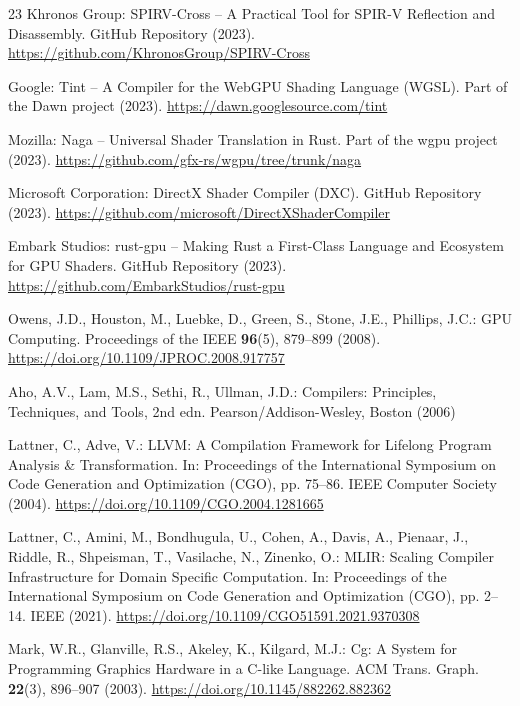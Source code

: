 \documentclass{svproc}
\begin{document}
\begin{thebibliography}{23}
Khronos Group: SPIRV-Cross -- A Practical Tool for SPIR-V Reflection and Disassembly.
GitHub Repository (2023).
\url{https://github.com/KhronosGroup/SPIRV-Cross}

Google: Tint -- A Compiler for the WebGPU Shading Language (WGSL).
Part of the Dawn project (2023).
\url{https://dawn.googlesource.com/tint}

Mozilla: Naga -- Universal Shader Translation in Rust.
Part of the wgpu project (2023).
\url{https://github.com/gfx-rs/wgpu/tree/trunk/naga}

Microsoft Corporation: DirectX Shader Compiler (DXC).
GitHub Repository (2023).
\url{https://github.com/microsoft/DirectXShaderCompiler}

Embark Studios: rust-gpu -- Making Rust a First-Class Language and Ecosystem for GPU Shaders.
GitHub Repository (2023).
\url{https://github.com/EmbarkStudios/rust-gpu}

Owens, J.D., Houston, M., Luebke, D., Green, S., Stone, J.E., Phillips, J.C.: GPU Computing.
Proceedings of the IEEE \textbf{96}(5), 879--899 (2008).
\url{https://doi.org/10.1109/JPROC.2008.917757}

Aho, A.V., Lam, M.S., Sethi, R., Ullman, J.D.: Compilers: Principles, Techniques, and Tools, 2nd edn.
Pearson/Addison-Wesley, Boston (2006)

Lattner, C., Adve, V.: LLVM: A Compilation Framework for Lifelong Program Analysis \& Transformation.
In: Proceedings of the International Symposium on Code Generation and Optimization (CGO), pp. 75--86.
IEEE Computer Society (2004).
\url{https://doi.org/10.1109/CGO.2004.1281665}

Lattner, C., Amini, M., Bondhugula, U., Cohen, A., Davis, A., Pienaar, J., Riddle, R., Shpeisman, T., Vasilache, N., Zinenko, O.: MLIR: Scaling Compiler Infrastructure for Domain Specific Computation.
In: Proceedings of the International Symposium on Code Generation and Optimization (CGO), pp. 2--14.
IEEE (2021).
\url{https://doi.org/10.1109/CGO51591.2021.9370308}

Mark, W.R., Glanville, R.S., Akeley, K., Kilgard, M.J.: Cg: A System for Programming Graphics Hardware in a C-like Language.
ACM Trans. Graph. \textbf{22}(3), 896--907 (2003).
\url{https://doi.org/10.1145/882262.882362}


\end{thebibliography}
\end{document}
